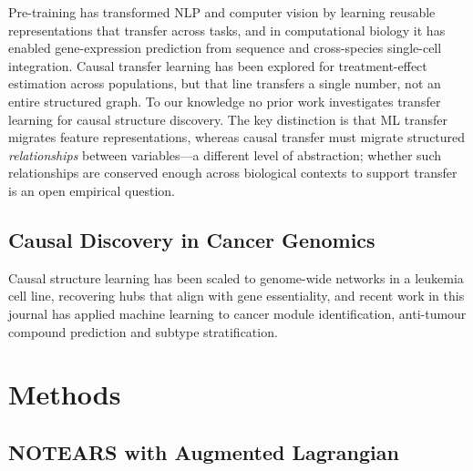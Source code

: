 \documentclass{ws-jbcb}
\begin{document}
Pre-training has transformed NLP and computer vision\cite{devlin2019,dosovitskiy2021} by learning reusable representations that transfer across tasks, and in computational biology it has enabled gene-expression prediction from sequence\cite{theodoris2023transfer} and cross-species single-cell integration. Causal transfer learning has been explored for treatment-effect estimation across populations,\cite{wang2021multi} but that line transfers a single number, not an entire structured graph. To our knowledge no prior work investigates transfer learning for causal structure discovery. The key distinction is that ML transfer migrates feature representations, whereas causal transfer must migrate structured \textit{relationships} between variables---a different level of abstraction; whether such relationships are conserved enough across biological contexts to support transfer is an open empirical question.

\subsection{Causal Discovery in Cancer Genomics}

Causal structure learning has been scaled to genome-wide networks in a leukemia cell line, recovering hubs that align with gene essentiality\cite{brown2025}, and recent work in this journal has applied machine learning to cancer module identification,\cite{lee2021cancer} anti-tumour compound prediction\cite{sun2022prediction} and subtype stratification.\cite{relvas2023model}

\section{Methods}

\subsection{NOTEARS with Augmented Lagrangian}
\end{document}
